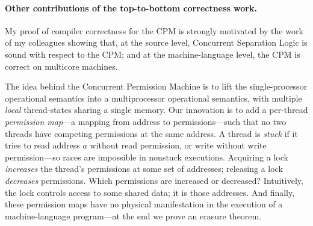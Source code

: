 \paragraph{Other contributions of the top-to-bottom correctness work.}  My proof of compiler correctness for the CPM is strongly motivated by the work of my colleagues showing that, at the source level, Concurrent Separation Logic is sound with respect to the CPM; and at the machine-language level, the CPM is correct on multicore machines.  


The idea behind the Concurrent Permission Machine is to lift the single-processor operational semantics into a
multiprocessor operational semantics, with multiple \emph{local}
thread-states sharing a single memory.
Our innovation is to add a
per-thread
\emph{permission map}---a mapping from address to permissions---such
that no two threads have competing permissions at the same address.
A thread is \emph{stuck} if it tries to read address $a$ without read permission,
or write without write permission---so races are impossible in nonstuck executions.
Acquiring a lock \emph{increases}
the thread's permissions at some set of addresses; releasing a lock
\emph{decreases} permissions.  Which permissions are increased or
decreased?  Intuitively, the lock controls access to some shared
data; it is those addresses.
And finally, these permission maps have no physical manifestation in the
execution of a machine-language program---at the end we prove an
erasure theorem.


